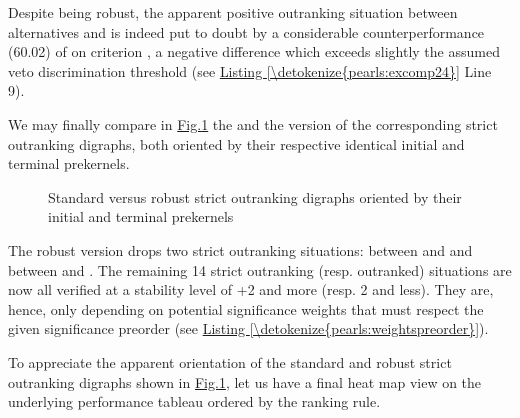 \documentclass[a4paper,12pt,english]{sphinxhowto}
\let\sphinxpxdimen\pdfpxdimen\else\newdimen\sphinxpxdimen
\begin{document}
\sphinxAtStartPar
Despite being robust, the apparent positive outranking situation between alternatives  and  is indeed put to doubt by a considerable counter\sphinxhyphen{}performance (\sphinxhyphen{}60.02) of  on criterion , a negative difference which exceeds slightly the assumed veto discrimination threshold  (see \hyperref[\detokenize{pearls:excomp24}]{Listing \ref{\detokenize{pearls:excomp24}}} Line 9).

\sphinxAtStartPar
We may finally compare in \hyperref[\detokenize{pearls:robstdstrictog}]{Fig.\@ \ref{\detokenize{pearls:robstdstrictog}}} the  and the  version of the corresponding strict outranking digraphs, both oriented by their respective identical initial and terminal prekernels.

\begin{figure}[H]
\centering
\capstart

\noindent\sphinxincludegraphics[width=600\sphinxpxdimen]{{robStdStrictOutranking}.png}
\caption{Standard versus robust strict outranking digraphs oriented by their initial and terminal prekernels}\label{\detokenize{pearls:robstdstrictog}}\end{figure}

\sphinxAtStartPar
The robust version drops two strict outranking situations: between  and  and between  and . The remaining 14 strict outranking (resp. outranked) situations are now all verified at a stability level of +2 and more (resp. \sphinxhyphen{}2 and less). They are, hence, only depending on potential significance weights that must respect the given significance preorder (see \hyperref[\detokenize{pearls:weightspreorder}]{Listing \ref{\detokenize{pearls:weightspreorder}}}).

\sphinxAtStartPar
To appreciate the apparent orientation of the standard and robust strict outranking digraphs shown in \hyperref[\detokenize{pearls:robstdstrictog}]{Fig.\@ \ref{\detokenize{pearls:robstdstrictog}}}, let us have a final heat map view on the underlying performance tableau ordered by the  ranking rule.

\begin{sphinxVerbatim}[commandchars=\\\{\}]
                             
\end{sphinxVerbatim}
\end{document}
